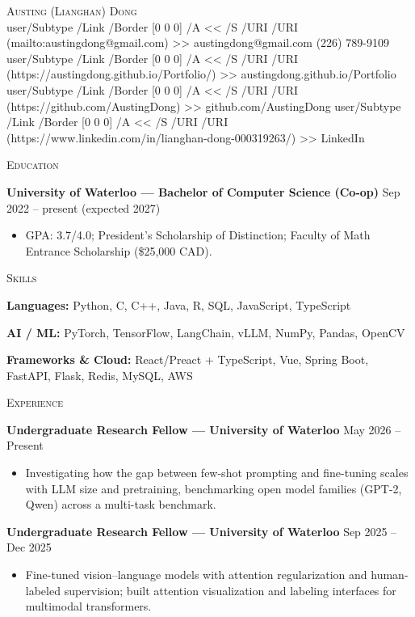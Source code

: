 \documentclass[10pt]{article}
\newcommand{\href}[2]{%
  \leavevmode
  \pdfstartlink user{/Subtype /Link /Border [0 0 0] /A << /S /URI /URI (#1) >>}%
  \textcolor{accent}{#2}%
  \pdfendlink}
\newcommand{\cvsection}[1]{%
  \par\vspace{0.75em}%
  {\noindent\normalsize\scshape\color{accent}#1\par}%
  \vspace{-0.6em}\noindent{\color{rulegray}\rule{\textwidth}{0.6pt}}\par
  \vspace{0.2em}%
}
\newcommand{\entry}[2]{\noindent\textbf{#1} \hfill {\small\color{mutedgray}#2}\par}
\newcommand{\sep}{\;{\color{rulegray}\textbar}\;}
\begin{document}
\begin{center}
  {\LARGE\scshape Austing (Lianghan) Dong}\\[0.45em]
  {\small
    \href{mailto:austingdong@gmail.com}{austingdong@gmail.com}\sep
    (226) 789-9109\sep
    \href{https://austingdong.github.io/Portfolio/}{austingdong.github.io/Portfolio}\sep
    \href{https://github.com/AustingDong}{github.com/AustingDong}\sep
    \href{https://www.linkedin.com/in/lianghan-dong-000319263/}{LinkedIn}
  }
\end{center}

\cvsection{Education}
\entry{University of Waterloo --- Bachelor of Computer Science (Co-op)}{Sep 2022 -- present (expected 2027)}
\begin{itemize}
  \item GPA: 3.7/4.0; President's Scholarship of Distinction; Faculty of Math Entrance Scholarship (\$25{,}000 CAD).
\end{itemize}

\cvsection{Skills}
\noindent\textbf{Languages:} Python, C, C++, Java, R, SQL, JavaScript, TypeScript\par
\vspace{0.1em}
\noindent\textbf{AI / ML:} PyTorch, TensorFlow, LangChain, vLLM, NumPy, Pandas, OpenCV\par
\vspace{0.1em}
\noindent\textbf{Frameworks \& Cloud:} React/Preact + TypeScript, Vue, Spring Boot, FastAPI, Flask, Redis, MySQL, AWS\par

\cvsection{Experience}
\entry{Undergraduate Research Fellow --- University of Waterloo}{May 2026 -- Present}
\begin{itemize}
  \item Investigating how the gap between few-shot prompting and fine-tuning scales with LLM size and pretraining, benchmarking open model families (GPT-2, Qwen) across a multi-task benchmark.
\end{itemize}

\vspace{0.35em}
\entry{Undergraduate Research Fellow --- University of Waterloo}{Sep 2025 -- Dec 2025}
\begin{itemize}
  \item Fine-tuned vision--language models with attention regularization and human-labeled supervision; built attention visualization and labeling interfaces for multimodal transformers.
\end{itemize}
\end{document}
